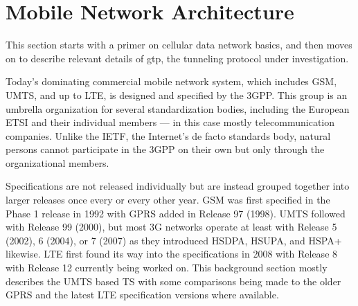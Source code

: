 \section{Mobile Network Architecture}
\label{c4:3gpparchitecture}

This section starts with a primer on cellular data network basics, and then moves on to describe relevant details of \gls{gtp}, the tunneling protocol under investigation.

Today's dominating commercial mobile network system, which includes \gls{GSM}, \gls{UMTS}, and up to \gls{LTE}, is designed and specified by the \gls{3GPP}. This group is an umbrella organization for several standardization bodies, including the European \gls{ETSI} and their individual members --- in this case mostly telecommunication companies. Unlike the \gls{IETF}, the Internet's de facto standards body, natural persons cannot participate in the \gls{3GPP} on their own but only through the organizational members.

Specifications are not released individually but are instead grouped together into larger releases once every or every other year. \gls{GSM} was first specified in the Phase 1 release in 1992 with \gls{GPRS} added in Release 97 (1998). \gls{UMTS} followed with Release 99 (2000), but most 3G networks operate at least with Release 5 (2002), 6 (2004), or 7 (2007) as they introduced \gls{HSDPA}, \gls{HSUPA}, and \gls{HSPA+} likewise. \gls{LTE} first found its way into the specifications in 2008 with Release 8 with Release 12 currently being worked on. This background section mostly describes the \gls{UMTS} based \gls{TS} with some comparisons being made to the older \gls{GPRS} and the latest \gls{LTE} specification versions where available.

